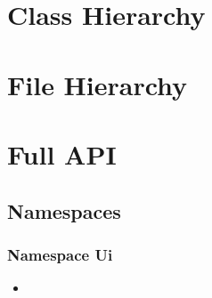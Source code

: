 \documentclass[letterpaper,10pt,english]{sphinxmanual}
\begin{document}
\section{Class Hierarchy}
\label{\detokenize{api/library_root:class-hierarchy}}



\section{File Hierarchy}
\label{\detokenize{api/library_root:file-hierarchy}}



\section{Full API}
\label{\detokenize{api/library_root:full-api}}

\subsection{Namespaces}
\label{\detokenize{api/library_root:namespaces}}
\sphinxstepscope


\subsubsection{Namespace Ui}
\label{\detokenize{api/namespace_Ui:namespace-ui}}\label{\detokenize{api/namespace_Ui:id1}}\label{\detokenize{api/namespace_Ui::doc}}
\begin{sphinxShadowBox}
\begin{itemize}
\item {} 
\sphinxAtStartPar
{}\label{\detokenize{api/namespace_Ui:id2}}{\hyperref[\detokenize{api/namespace_Ui:classes}]{}}

\end{itemize}
\end{sphinxShadowBox}
\end{document}
